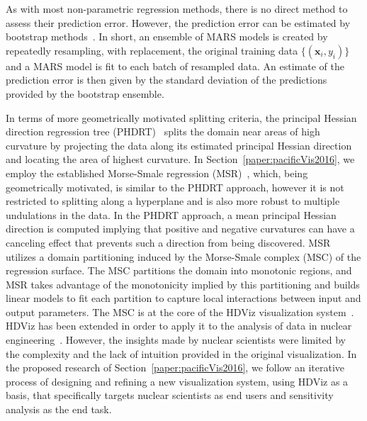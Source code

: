 As with most non-parametric regression methods, there is no direct method to assess their prediction error.
%
However, the prediction error can be estimated by bootstrap methods~\cite{DavisonHinkley1997}.
%
In short, an ensemble of MARS models is created by repeatedly resampling, with replacement, the original training data $\{ (\mathbf{x}_i, y_i) \}$ and a MARS model is fit to each batch of resampled data.
%
An estimate of the prediction error is then given by the standard deviation of the predictions provided by the bootstrap ensemble.

In terms of more geometrically motivated splitting criteria, the principal Hessian direction regression tree (PHDRT)~\cite{LiLueChen2000} splits the domain near areas of high curvature by projecting the data along its estimated principal Hessian direction and locating the area of highest curvature.
%
In Section~\ref{paper:pacificVis2016}, we employ the established Morse-Smale regression (MSR)~\cite{GerberRubelBremer2011}, which, being geometrically motivated, is similar to the PHDRT approach, however it is not restricted to splitting along a hyperplane and is also more robust to multiple undulations in the data.
%
In the PHDRT approach, a mean principal Hessian direction is computed implying that positive and negative curvatures can have a canceling effect that prevents such a direction from being discovered.
%
MSR utilizes a domain partitioning induced by the Morse-Smale complex (MSC) of the regression surface.
%
The MSC partitions the domain into monotonic regions, and MSR takes advantage of the monotonicity implied by this partitioning and builds linear models to fit each partition to capture local interactions between input and output parameters.
%
The MSC is at the core of the HDViz visualization system~\cite{GerberBremerPascucci2010}.
%
HDViz has been extended in order to apply it to the analysis of data in nuclear engineering~\cite{MaljovecLiuWang2015,MaljovecWangMandelli2013a,MaljovecWangPascucci2013}.
%
However, the insights made by nuclear scientists were limited by the complexity and the lack of intuition provided in the original visualization.
%
In the proposed research of Section~\ref{paper:pacificVis2016}, we follow an iterative process of designing and refining a new visualization system, using HDViz as a basis, that specifically targets nuclear scientists as end users and sensitivity analysis as the end task.
%

